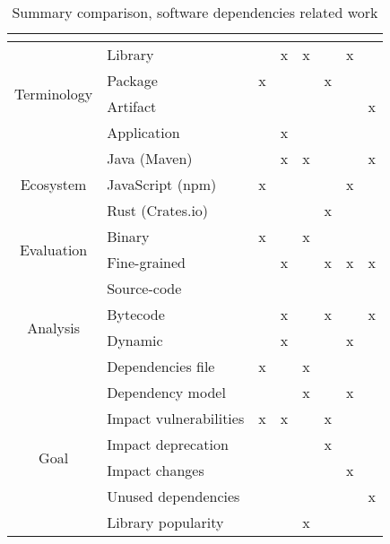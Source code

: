 \begin{table}[ht!]
\begin{center}
  \begin{tabular}{|c|l|c|c|c|c|c|c|}
  \hline
   &  & \cite{hejderup2015dependencies} & \cite{plate2015impact} & \cite{Kula2017} & \cite{hejderup2018prazi} & \cite{hejderup2018software} & \cite{soto2020comprehensive} \\ \hline\hline
  \multirow{4}{*}{Terminology} & Library &  & x & x &  & x &  \\ \cline{2-8}
   & Package & x &  &  & x &  &  \\ \cline{2-8}
   & Artifact &  &  &  &  &  & x \\ \cline{2-8}
   & Application &  & x &  &  &  &  \\ \hline\hline
  \multirow{3}{*}{Ecosystem} & Java (Maven) &  & x & x &  &  & x \\ \cline{2-8}
   & JavaScript (npm) & x &  &  &  & x &  \\ \cline{2-8}
   & Rust (Crates.io) &  &  &  & x &  &  \\ \hline\hline
  \multirow{2}{*}{Evaluation} & Binary & x &  & x &  &  &  \\ \cline{2-8}
   & Fine-grained &  & x &  & x & x & x \\ \hline\hline
  \multirow{4}{*}{Analysis} & Source-code &  &  &  &  &  &  \\ \cline{2-8}
   & Bytecode &  & x &  & x &  & x \\ \cline{2-8}
   & Dynamic &  & x &  &  & x &  \\ \cline{2-8}
   & Dependencies file & x &  & x &  &  &  \\ \hline\hline
  \multirow{6}{*}{Goal} & Dependency model &  &  & x &  & x &  \\ \cline{2-8}
   & Impact vulnerabilities & x & x &  & x &  &  \\ \cline{2-8}
   & Impact deprecation &  &  &  & x &  &  \\ \cline{2-8}
   & Impact changes &  &  &  &  & x &  \\ \cline{2-8}
   & Unused dependencies &  &  &  &  &  & x \\ \cline{2-8}
   & Library popularity &  &  & x &  &  &  \\ \hline
  \end{tabular}
\end{center}
\caption{Summary comparison, software dependencies related work}
\label{table:summary-software-dependencies}
\end{table}


